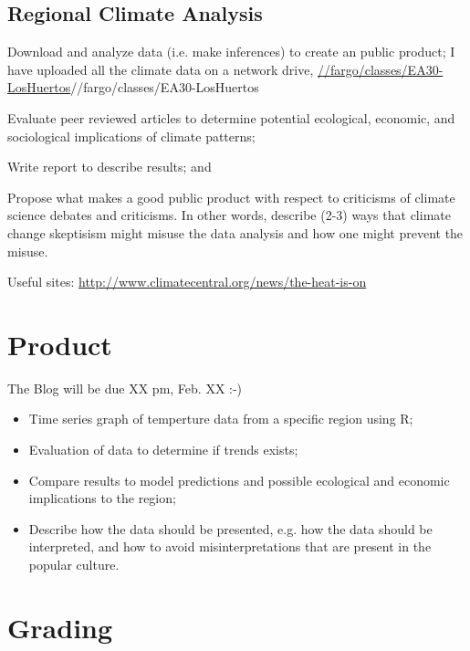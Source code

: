 \documentclass{article}\usepackage[]{graphicx}\usepackage[]{color}
\newenvironment{enumerate*}%
  {\begin{enumerate}%
    \setlength{\itemsep}{0pt}%
    \setlength{\parskip}{0pt}}%
  {\end{enumerate}}
\begin{document}
\subsection{Regional Climate Analysis}

\begin{enumerate*}

  \item Download and analyze data (i.e. make inferences) to create an public product; I have uploaded all the climate data on a network drive, \url{//fargo/classes/EA30-LosHuertos}{//fargo/classes/EA30-LosHuertos}
  
  \item Evaluate peer reviewed articles to determine potential ecological, economic, and sociological implications of climate patterns; 
  \item Write report to describe results; and
  \item Propose what makes a good public product with respect to criticisms of climate science debates and criticisms. In other words, describe (2-3) ways that climate change skeptisism might misuse the data analysis and how one might prevent the misuse.
\end{enumerate*}

Useful sites: \href{http://www.climatecentral.org/news/the-heat-is-on}{http://www.climatecentral.org/news/the-heat-is-on}

\section{Product}

The Blog will be due XX pm, Feb. XX :-)

\begin{itemize}
  \item Time series graph of temperture data from a specific region using R; 
  \item Evaluation of data to determine if trends exists;
  \item Compare results to model predictions and possible ecological and economic implications to the region; 
  \item Describe how the data should be presented, e.g. how the data should be interpreted, and how to avoid misinterpretations that are present in the popular culture.
  
\end{itemize}

\section{Grading}
\end{document}
